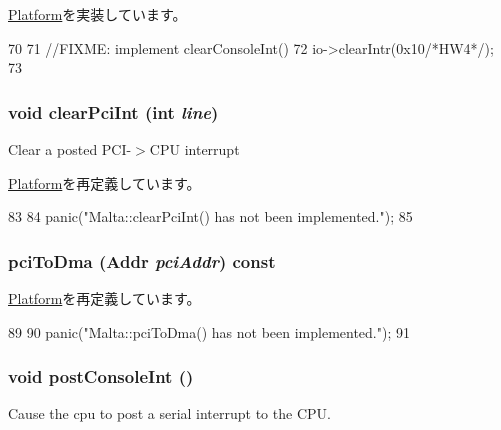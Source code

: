 \hyperlink{classPlatform_aaf1bfcf0f5ac95c6a9d1607172a5a29e}{Platform}を実装しています。


\begin{DoxyCode}
70 {
71     //FIXME: implement clearConsoleInt()
72     io->clearIntr(0x10/*HW4*/);
73 }
\end{DoxyCode}
\hypertarget{classMalta_a0d98ea2b236bb883fa15d63a59a2ec9e}{
\subsubsection[{clearPciInt}]{\setlength{\rightskip}{0pt plus 5cm}void clearPciInt (int {\em line})}}
\label{classMalta_a0d98ea2b236bb883fa15d63a59a2ec9e}
Clear a posted PCI-\/$>$CPU interrupt 

\hyperlink{classPlatform_a0d98ea2b236bb883fa15d63a59a2ec9e}{Platform}を再定義しています。


\begin{DoxyCode}
83 {
84     panic("Malta::clearPciInt() has not been implemented.");
85 }
\end{DoxyCode}
\hypertarget{classMalta_a87078b3d3a28ae134f6736337e90dac3}{
\subsubsection[{pciToDma}]{ pciToDma ({\bf Addr} {\em pciAddr}) const}}
\label{classMalta_a87078b3d3a28ae134f6736337e90dac3}


\hyperlink{classPlatform_a87078b3d3a28ae134f6736337e90dac3}{Platform}を再定義しています。


\begin{DoxyCode}
89 {
90     panic("Malta::pciToDma() has not been implemented.");
91 }
\end{DoxyCode}
\hypertarget{classMalta_a5b278cebc0a62bc2195edf27f059ab1a}{
\subsubsection[{postConsoleInt}]{\setlength{\rightskip}{0pt plus 5cm}void postConsoleInt ()}}
\label{classMalta_a5b278cebc0a62bc2195edf27f059ab1a}
Cause the cpu to post a serial interrupt to the CPU. 

